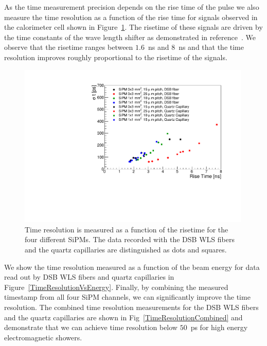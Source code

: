 As the time measurement precision depends on the rise time of the pulse we also
measure the time resolution as a function of the rise time for signals observed 
in the calorimeter cell shown in Figure~\ref{RiseTime}. The risetime of these signals 
are driven by the time constants of the wave length shifter as 
demonstrated in reference~\cite{Anderson:2015gha}. We observe that the risetime
ranges between $1.6$~ns and $8$~ns and that the time resolution improves 
roughly proportional to the risetime of the signals. 


\begin{figure}[htb]
\centering
\includegraphics[width=0.99\textwidth]{figures/ShashlikTimeResolutionVsRiseTime.pdf}
\caption{\label{RiseTime}Time resolution is measured as a function of the risetime
for the four different SiPMs. The data recorded with the DSB WLS fibers and the
quartz capillaries are distinguished as dots and squares. }
\end{figure}



We show the time resolution measured as a function of the beam energy for
data read out by DSB WLS fibers and quartz capillaries in 
Figure~\ref{TimeResolutionVsEnergy}. Finally, by combining the measured timestamp
from all four SiPM channels, we can significantly improve the time resolution.
The combined time resolution measurements for the DSB WLS fibers and the quartz capillaries are shown in
Fig~\ref{TimeResolutionCombined} and demonstrate that we can achieve time resolution
below $50$~ps for high energy electromagnetic showers.


